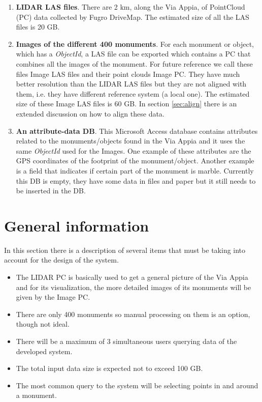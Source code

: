 \documentclass[a4paper,11pt]{article}
\begin{document}
\begin{enumerate}
	\item \textbf{LIDAR LAS files}. There are 2 km, along the Via Appia, of PointCloud (PC) data collected by Fugro DriveMap. The estimated size of all the LAS files is 20 GB.
    \item \textbf{Images of the different 400 monuments}. For each monument or object, which has a \textit{ObjectId}, a LAS file can be exported which contains a PC that combines all the images of the monument. For future reference we call these files Image LAS files and their point clouds Image PC. They have much better resolution than the LIDAR LAS files but they are not aligned with them, i.e. they have different reference system (a local one). The estimated size of these Image LAS files is 60 GB. In section \ref{sec:align} there is an extended discussion on how to align these data.
    \item \textbf{An attribute-data DB}. This Microsoft Access database contains attributes related to the monuments/objects found in the Via Appia and it uses the same \textit{ObjectId} used for the Images. One example of these attributes are the GPS coordinates of the footprint of the monument/object. Another example is a field that indicates if certain part of the monument is marble. Currently this DB is empty, they have some data in files and paper but it still needs to be inserted in the DB.
\end{enumerate}

\section{General information}

In this section there is a description of several items that must be taking into account for the design of the system.

\begin{itemize}
\item The LIDAR PC is basically used to get a general picture of the Via Appia and for its visualization, the more detailed images of its monuments will be given by the Image PC.
\item There are only 400 monuments so manual processing on them is an option, though not ideal.
\item There will be a maximum of 3 simultaneous users querying data of the developed system.
\item The total input data size is expected not to exceed 100 GB.
\item The most common query to the system will be selecting points in and around a monument.
\end{itemize}
\end{document}

